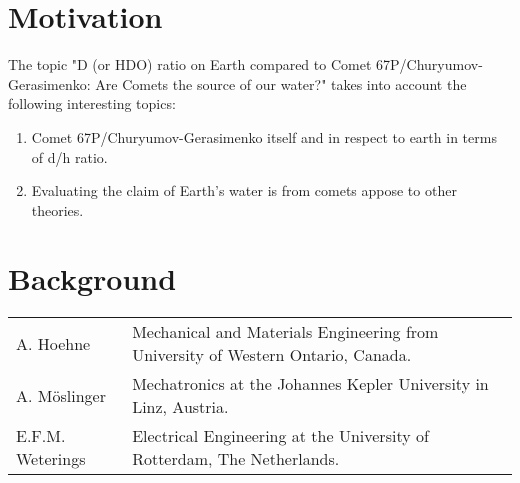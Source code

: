 \documentclass[11pt]{article}
\begin{document}


\section{Motivation}
The topic "D (or HDO) ratio on Earth compared to Comet 67P/Churyumov-Gerasimenko: Are Comets the source of our water?" takes into account the following interesting topics:

\begin{enumerate}
	\item Comet 67P/Churyumov-Gerasimenko itself and in respect to earth in terms of d/h ratio.
	\item Evaluating the claim of Earth's water is from comets appose to other theories.
\end{enumerate}


\section{Background}
\begin{tabular}{l l}
A. Hoehne & Mechanical and Materials Engineering from University of Western Ontario, Canada.\\
A. M\"{o}slinger & Mechatronics at the Johannes Kepler University in Linz, Austria.\\
E.F.M. Weterings & Electrical Engineering at the University of Rotterdam, The Netherlands.
\end{tabular}
\end{document}
